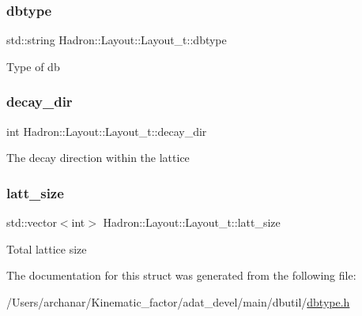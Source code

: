 \subsubsection{\texorpdfstring{dbtype}{dbtype}}
{\footnotesize\ttfamily std\+::string Hadron\+::\+Layout\+::\+Layout\+\_\+t\+::dbtype}

Type of db \mbox{\label{structHadron_1_1Layout_1_1Layout__t_aeb89b410154551d4dade862bf5a55955}} 
\subsubsection{\texorpdfstring{decay\_dir}{decay\_dir}}
{\footnotesize\ttfamily int Hadron\+::\+Layout\+::\+Layout\+\_\+t\+::decay\+\_\+dir}

The decay direction within the lattice \mbox{\label{structHadron_1_1Layout_1_1Layout__t_af7148e38cf735a902e10e5d1baa09163}} 
\subsubsection{\texorpdfstring{latt\_size}{latt\_size}}
{\footnotesize\ttfamily std\+::vector$<$int$>$ Hadron\+::\+Layout\+::\+Layout\+\_\+t\+::latt\+\_\+size}

Total lattice size 

The documentation for this struct was generated from the following file\+:\begin{DoxyCompactItemize}
\item 
/\+Users/archanar/\+Kinematic\+\_\+factor/adat\+\_\+devel/main/dbutil/\mbox{\hyperlink{dbtype_8h}{dbtype.\+h}}\end{DoxyCompactItemize}
